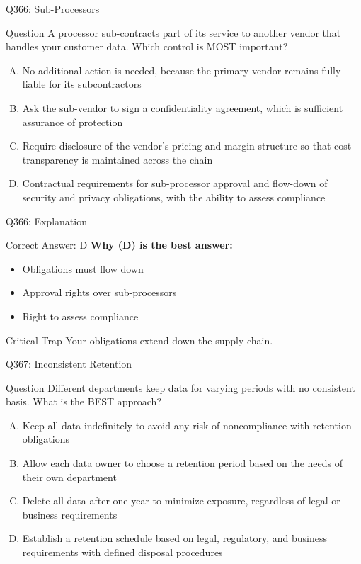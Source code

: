 \documentclass{beamer}
\begin{document}
	\begin{frame}{Q366: Sub-Processors}
		\begin{block}{Question}
			\small A processor sub-contracts part of its service to another vendor that handles your customer data. Which control is MOST important?
		\end{block}
		\begin{enumerate}[(A)]
			\footnotesize
			\item No additional action is needed, because the primary vendor remains fully liable for its subcontractors
			\item Ask the sub-vendor to sign a confidentiality agreement, which is sufficient assurance of protection
			\item Require disclosure of the vendor's pricing and margin structure so that cost transparency is maintained across the chain
			\item Contractual requirements for sub-processor approval and flow-down of security and privacy obligations, with the ability to assess compliance
		\end{enumerate}
	\end{frame}
	
	\begin{frame}{Q366: Explanation}
		\begin{block}{Correct Answer: D}
			\textbf{Why (D) is the best answer:}
			\begin{itemize}
				\item Obligations must flow down
				\item Approval rights over sub-processors
				\item Right to assess compliance
			\end{itemize}
		\end{block}
		\begin{alertblock}{Critical Trap}
			Your obligations extend down the supply chain.
		\end{alertblock}
	\end{frame}
	
	\begin{frame}{Q367: Inconsistent Retention}
		\begin{block}{Question}
			\small Different departments keep data for varying periods with no consistent basis. What is the BEST approach?
		\end{block}
		\begin{enumerate}[(A)]
			\footnotesize
			\item Keep all data indefinitely to avoid any risk of noncompliance with retention obligations
			\item Allow each data owner to choose a retention period based on the needs of their own department
			\item Delete all data after one year to minimize exposure, regardless of legal or business requirements
			\item Establish a retention schedule based on legal, regulatory, and business requirements with defined disposal procedures
		\end{enumerate}
	\end{frame}
	
\end{document}
